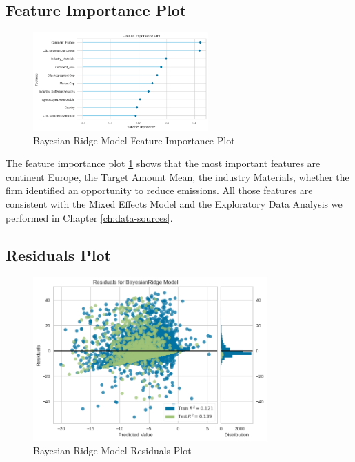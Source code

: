 \subsection{Feature Importance Plot}
\begin{figure}[H]
    \centering
    \includegraphics[width=0.6\textwidth]{figures/Bayes_Importance.png}
    \caption{Bayesian Ridge Model Feature Importance Plot}
    \label{fig:bayesian_ridge_feature_importance}
\end{figure}
The feature importance plot \ref{fig:bayesian_ridge_feature_importance} shows that the most important features are continent Europe, the Target Amount Mean, the industry Materials, whether the firm identified an opportunity to reduce emissions. All those features are consistent with the Mixed Effects Model and the Exploratory Data Analysis we performed in Chapter \ref{ch:data-sources}. 

\subsection{Residuals Plot}
\begin{figure}[H]
    \centering
    \includegraphics[width=0.8\textwidth]{figures/Bayes_Residuals.png}
    \caption{Bayesian Ridge Model Residuals Plot}
    \label{fig:bayesian_ridge_residuals}
\end{figure}

